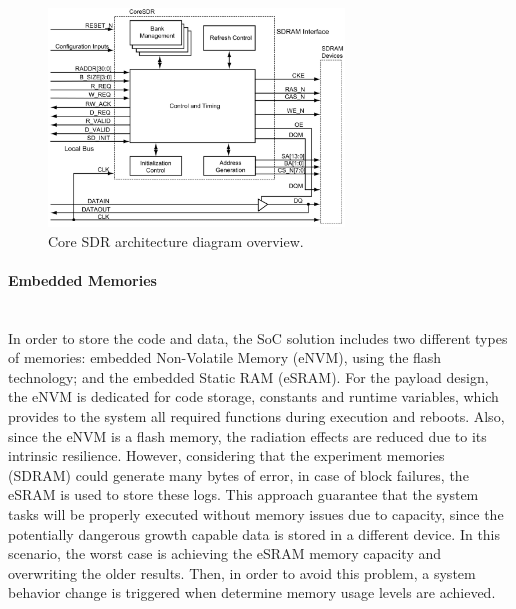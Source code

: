 \begin{figure}[!ht]
    \begin{center}
        \includegraphics[width=0.7\textwidth]{figures/core_sdr.png}
        \caption{Core SDR architecture diagram overview.}
        \label{fig:core_sdr}
    \end{center}
\end{figure}

\paragraph{Embedded Memories} \mbox{}\\

In order to store the code and data, the SoC solution includes two different types of memories: embedded Non-Volatile Memory (eNVM), using the flash technology; and the embedded Static RAM (eSRAM). For the payload design, the eNVM is dedicated for code storage, constants and runtime variables, which provides to the system all required functions during execution and reboots. Also, since the eNVM is a flash memory, the radiation effects are reduced due to its intrinsic resilience. However, considering that the experiment memories (SDRAM) could generate many bytes of error, in case of block failures, the eSRAM is used to store these logs. This approach guarantee that the system tasks will be properly executed without memory issues due to capacity, since the potentially dangerous growth capable data is stored in a different device. In this scenario, the worst case is achieving the eSRAM memory capacity and overwriting the older results. Then, in order to avoid this problem, a system behavior change is triggered when determine memory usage levels are achieved.

